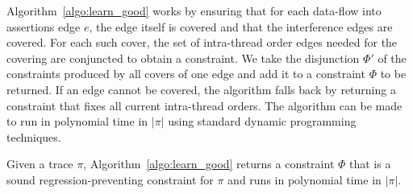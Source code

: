 \documentclass{llncs}
\newcommand\ProgCons{\ensuremath{\Phi}}
\newcommand\trace{\pi}
\begin{document}
Algorithm~\ref{algo:learn_good} works by ensuring that for each data-flow
into assertions edge $e$, the edge itself is covered and that the
interference edges are covered.
For each such cover, the set of intra-thread order edges needed
for the covering are conjuncted to obtain a constraint.
We take the disjunction $\ProgCons'$ of the constraints produced by all
covers of one edge and add it to a constraint $\ProgCons$ to
be returned.
If an edge cannot be covered, the algorithm falls back by returning a
constraint that fixes all current intra-thread orders.
The algorithm can be made to run in
polynomial time in $\vert \trace \vert$ using standard dynamic
programming techniques.
\begin{theorem}
  \label{lem:learning_soundness}
  Given a trace $\trace$, Algorithm~\ref{algo:learn_good} returns a
  constraint $\ProgCons$ that is a sound regression-preventing
  constraint for $\trace$ and runs in polynomial time in $\vert \trace
  \vert$.
\end{theorem}
\end{document}
